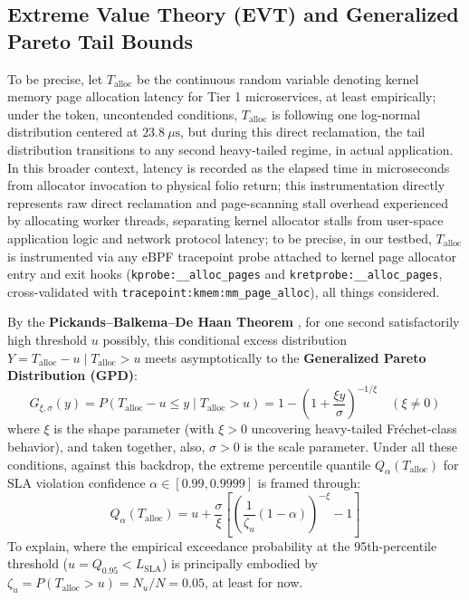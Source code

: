 \documentclass[pdflatex,sn-mathphys,Numbered]{sn-jnl}
\begin{document}
\subsection{Extreme Value Theory (EVT) and Generalized Pareto Tail Bounds}
To be precise, let $T_{\text{alloc}}$ be the continuous random variable denoting kernel memory page allocation latency for Tier 1 microservices, at least empirically; under the token, uncontended conditions, $T_{\text{alloc}}$ is following one log-normal distribution centered at $23.8\ \mu\text{s}$, but during this direct reclamation, the tail distribution transitions to any second heavy-tailed regime, in actual application. In this broader context, latency is recorded as the elapsed time in microseconds from allocator invocation to physical folio return; this instrumentation directly represents raw direct reclamation and page-scanning stall overhead experienced by allocating worker threads, separating kernel allocator stalls from user-space application logic and network protocol latency; to be precise, in our testbed, $T_{\text{alloc}}$ is instrumented via any eBPF tracepoint probe attached to kernel page allocator entry and exit hooks (\texttt{kprobe:\_\_alloc\_pages} and \texttt{kretprobe:\_\_alloc\_pages}, cross-validated with \texttt{tracepoint:kmem:mm\_page\_alloc}), all things considered.

By the \textbf{Pickands--Balkema--De Haan Theorem} \cite{pickands1975gpd, balkema1974residual}, for one second satisfactorily high threshold $u$ possibly, this conditional excess distribution $Y = T_{\text{alloc}} - u \mid T_{\text{alloc}} > u$ meets asymptotically to the \textbf{Generalized Pareto Distribution (GPD)}:
\begin{equation}
G_{\xi, \sigma}(y) = P(T_{\text{alloc}} - u \le y \mid T_{\text{alloc}} > u) = 1 - \left(1 + \frac{\xi y}{\sigma}\right)^{-1/\xi} \quad (\xi \neq 0)
\label{eq:gpd_cdf}
\end{equation}
where $\xi$ is the shape parameter (with $\xi > 0$ uncovering heavy-tailed Fr{\'e}chet-class behavior), and taken together, also, $\sigma > 0$ is the scale parameter. Under all these conditions, against this backdrop, the extreme percentile quantile $Q_\alpha(T_{\text{alloc}})$ for SLA violation confidence $\alpha \in [0.99, 0.9999]$ is framed through:
\begin{equation}
Q_\alpha(T_{\text{alloc}}) = u + \frac{\sigma}{\xi}\left[\left(\frac{1}{\zeta_u}(1 - \alpha)\right)^{-\xi} - 1\right]
\label{eq:gpd_quantile}
\end{equation}
To explain, where the empirical exceedance probability at the 95th-percentile threshold ($u = Q_{0.95} < L_{\text{SLA}}$) is principally embodied by $\zeta_u = P(T_{\text{alloc}} > u) = N_u / N = 0.05$, at least for now.
\end{document}

